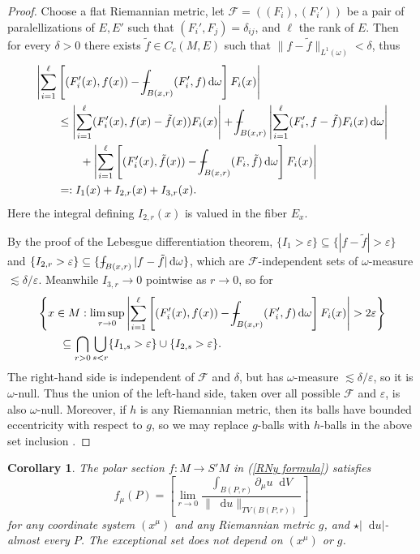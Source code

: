 \documentclass[reqno,11pt]{amsart}
\newcommand*\dif{\mathop{}\!\mathrm{d}}
\newtheorem{corollary}[theorem]{Corollary}
\theoremstyle{definition}
\numberwithin{equation}{section}
\def\Xint#1{\mathchoice
{\XXint\displaystyle\textstyle{#1}}%
{\XXint\textstyle\scriptstyle{#1}}%
{\XXint\scriptstyle\scriptscriptstyle{#1}}%
{\XXint\scriptscriptstyle\scriptscriptstyle{#1}}%
\!\int}
\def\XXint#1#2#3{{\setbox0=\hbox{$#1{#2#3}{\int}$ }
\vcenter{\hbox{$#2#3$ }}\kern-.6\wd0}}
\def\dashint{\Xint-}
\begin{document}
\begin{proof}
Choose a flat Riemannian metric, let $\mathcal F = ((F_i), (F_i'))$ be a pair of paralellizations of $E, E'$ such that $(F_i', F_j) = \delta_{ij}$, and $\ell$ the rank of $E$.
Then for every $\delta > 0$ there exists $\tilde f \in C_c(M, E)$ such that $\|f - \tilde f\|_{L^1(\omega)} < \delta$, thus
\begin{align*}
&\left|\sum_{i=1}^\ell \left[(F_i'(x), f(x)) - \dashint_{B(x, r)} (F_i', f) \dif \omega\right] F_i(x)\right| \\
&\qquad \leq \left|\sum_{i=1}^\ell (F_i'(x), f(x) - \tilde f(x)) F_i(x)\right| + \dashint_{B(x, r)} \left|\sum_{i=1}^\ell (F_i', f - \tilde f)F_i(x) \dif \omega \right| \\
&\qquad \qquad + \left|\sum_{i=1}^\ell \left[(F_i'(x), \tilde f(x)) - \dashint_{B(x, r)} (F_i, \tilde f) \dif \omega\right] F_i(x)\right| \\
&\qquad =: I_1(x) + I_{2, r}(x) + I_{3, r}(x).
\end{align*}
Here the integral defining $I_{2, r}(x)$ is valued in the fiber $E_x$.

By the proof of the Lebesgue differentiation theorem, $\{I_1 > \varepsilon\} \subseteq \{|f - \tilde f| > \varepsilon\}$ and $\{I_{2, r} > \varepsilon\} \subseteq \{\dashint_{B(x, r)} |f - \tilde f|\dif \omega\}$, which are $\mathcal F$-independent sets of $\omega$-measure $\lesssim \delta/\varepsilon$.
Meanwhile $I_{3, r} \to 0$ pointwise as $r \to 0$, so for
\begin{align*}
&\left\{x \in M: \limsup_{r \to 0} \left|\sum_{i=1}^\ell \left[(F_i'(x), f(x)) - \dashint_{B(x, r)} (F_i', f) \dif \omega\right] F_i(x)\right| > 2\varepsilon\right\} \\
&\qquad \subseteq \bigcap_{r > 0}\bigcup_{s <r} \{I_{1, s} > \varepsilon\} \cup \{I_{2, s} > \varepsilon\}.
\end{align*}
The right-hand side is independent of $\mathcal F$ and $\delta$, but has $\omega$-measure $\lesssim \delta/\varepsilon$, so it is $\omega$-null.
Thus the union of the left-hand side, taken over all possible $\mathcal F$ and $\varepsilon$, is also $\omega$-null.
Moreover, if $h$ is any Riemannian metric, then its balls have bounded eccentricity with respect to $g$, so we may replace $g$-balls with $h$-balls in the above set inclusion \cite[Chapter 3, Corollary 1.7]{stein2009real}.
\end{proof}

\begin{corollary}
The polar section $f: M \to S'M$ in (\ref{RNy formula}) satisfies
\begin{equation}\label{Lebesgue point definition}
    f_\mu(P) = \left[\lim_{r \to 0} \frac{\int_{B(P, r)} \partial_\mu u \dif V}{\|\dif u\|_{TV(B(P, r))}}\right]
\end{equation}
for any coordinate system $(x^\mu)$ and any Riemannian metric $g$, and $\star|\dif u|$-almost every $P$.
The exceptional set does not depend on $(x^\mu)$ or $g$.
\end{corollary}
\end{document}
